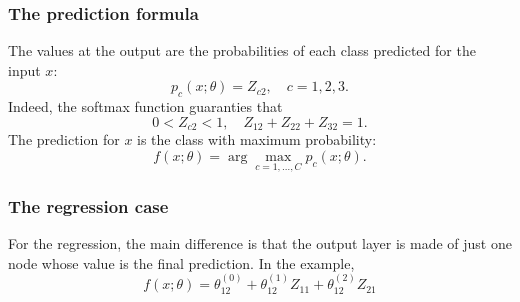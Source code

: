 \begin{frame}
\frametitle{The prediction formula}
The values at the output are the probabilities of each class predicted for the input $x$:
$$
p_c(x;\theta) = Z_{c2}, \quad c=1,2,3.
$$
Indeed, the softmax function guaranties that
$$
0 < Z_{c2} < 1, \quad Z_{12}+Z_{22}+Z_{32} = 1.
$$
The prediction for $x$ is the class with maximum probability:
$$
f(x;\theta) = \arg \max_{c=1,\ldots,C} p_c(x;\theta).
$$
\end{frame}
\begin{frame}
\frametitle{The regression case}
For the regression, the main difference is that the output layer is made of just one node whose value is the final prediction. In the example, 
$$
f(x;\theta) = \theta_{12}^{(0)} + \theta_{12}^{(1)} Z_{11} + \theta_{12}^{(2)} Z_{21}
$$
\end{frame}
